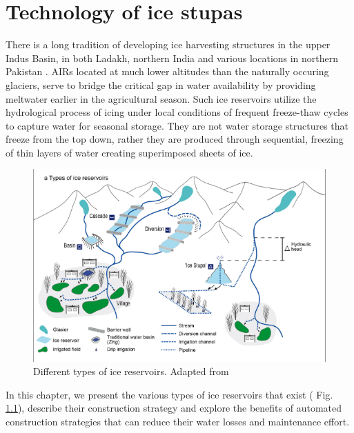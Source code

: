 \chapter{Technology of ice stupas}
\label{chap:tech}


There is a long tradition of developing ice harvesting structures in the upper Indus Basin, in both Ladakh,
northern India \citep{labbalTraditionalOasesLadakh2000, nusserIrrigationDevelopmentUpper2012} and various
locations in northern Pakistan \citep{kreutzmannScarcityOpulenceWater2011}. AIRs located at much lower altitudes
than the naturally occuring glaciers, serve to bridge the critical gap in water availability by providing
meltwater earlier in the agricultural season. Such ice reservoirs utilize the hydrological process of icing
under local conditions of frequent freeze-thaw cycles to capture water for seasonal storage. They are not water
storage structures that freeze from the top down, rather they are produced through sequential, freezing of thin
layers of water creating superimposed sheets of ice.

\begin{figure}[htb]
\centering
\includegraphics[width=\textwidth]{figs/AIR_designs}
\caption{Different types of ice reservoirs. Adapted from \cite{nusserSociohydrologyArtificialGlaciers2019}}
\label{fig:AIRdesigns}
\end{figure}

In this chapter, we present the various types of ice reservoirs that exist ( Fig. \ref{fig:AIRdesigns}),
describe their construction strategy and explore the benefits of automated construction strategies that can
reduce their water losses and maintenance effort. 

